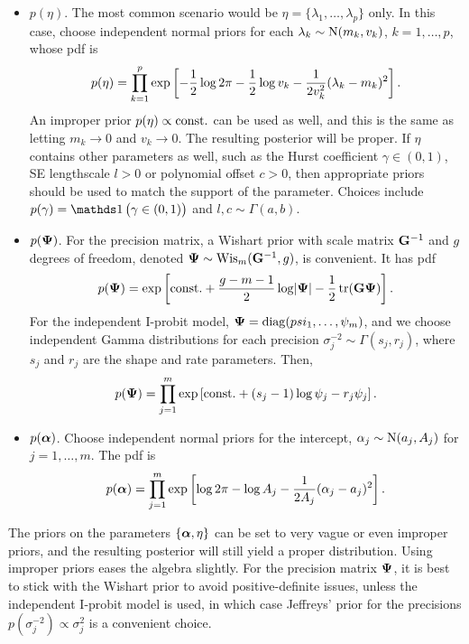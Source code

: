 \begin{itemize}
  \item {\boldmath$p(\eta)$}. The most common scenario would be $\eta = \{\lambda_1,\dots,\lambda_p\}$ only. In this case, choose independent normal priors for each $\lambda_k \sim \N(m_k,v_k)$, $k=1,\dots,p$, whose pdf is
  \begin{align*}
    p(\eta) = \prod_{k=1}^p \exp\left[-\half\log 2\pi - \half\log v_k - \frac{1}{2v_k^2} (\lambda_k - m_k)^2 \right].
  \end{align*} 
  An improper prior $p(\eta) \propto \const$ can be used as well, and this is the same as letting $m_k \to 0$ and $v_k\to 0$.
  The resulting posterior will be proper.
  If $\eta$ contains other parameters as well, such as the Hurst coefficient $\gamma \in (0,1)$, SE lengthscale $l >0$ or polynomial offset $c>0$, then appropriate priors should be used to match the support of the parameter.
  Choices include $p(\gamma) = \ind\big(\gamma \in (0,1)\big)$ and $l,c \sim \Gamma(a,b)$.
  
  \item {\boldmath$p(\bPsi)$}. For the precision matrix, a Wishart prior with scale matrix $\bG^{-1}$ and $g$ degrees of freedom, denoted $\bPsi \sim \Wis_m(\bG^{-1},g)$, is convenient. It has pdf
  \[
    p(\bPsi) = \exp\left[\const + \half[g-m-1]\log \abs{\bPsi} - \half\tr(\bG\bPsi)  \right].
  \]
  For the independent I-probit model, $\bPsi = \diag(\\psi_1,\dots,\psi_m)$, and we choose independent Gamma distributions for each precision $\sigma_j^{-2} \sim \Gamma(s_j,r_j)$, where $s_j$ and $r_j$ are the shape and rate parameters.
  Then,
  \[
    p(\bPsi) = \prod_{j=1}^m \exp\left[\const + (s_j - 1)\log \psi_j - r_j\psi_j \right].
  \] 
  
  \item {\boldmath$p(\balpha)$}. Choose independent normal priors for the intercept, $\alpha_j \sim \N(a_j,A_j)$ for $j=1,\dots,m$. The pdf is
  \[
    p(\balpha) = \prod_{j=1}^m \exp\left[\log 2\pi - \log A_j - \frac{1}{2A_j} (\alpha_j - a_j)^2  \right].
  \]
\end{itemize}

\begin{remark}
  The priors on the parameters $\{ \balpha,\eta \}$ can be set to very vague or even improper priors, and the resulting posterior will still yield a proper distribution.
  Using improper priors eases the algebra slightly.
  For the precision matrix $\bPsi$, it is best to stick with the Wishart prior to avoid positive-definite issues, unless the independent I-probit model is used, in which case Jeffreys' prior for the precisions $p(\sigma_j^{-2})\propto \sigma_j^2$ is a convenient choice.
\end{remark}

